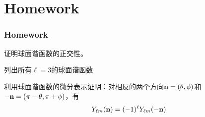 \documentclass[CJK]{beamer}
\begin{document}
\section{Homework}

\begin{frame}
\frametitle{Homework}

\bitem
\item{证明球面谐函数的正交性。}
\item{列出所有$\ell=3$的球面谐函数}
\item{利用球面谐函数的微分表示证明：对相反的两个方向${\mathbf{n}} = (\theta,\phi)$和$-{\mathbf{n}} = (\pi-\theta,\pi+\phi)$，有
  $$ Y_{\ell m}({\mathbf{n}}) = (-1)^\ell Y_{\ell m}(-{\mathbf{n}})$$}
  \eitem
\end{frame}

\ech
\end{document}
